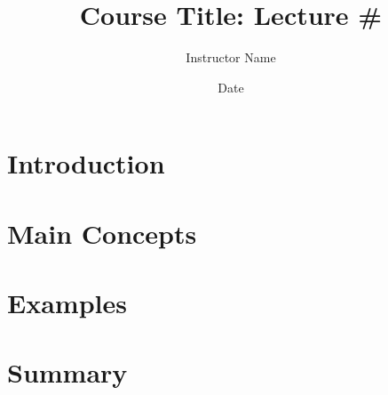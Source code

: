\documentclass[12pt]{article}
\begin{document}
\title{Course Title: Lecture \#}
\author{Instructor Name}
\date{Date}
\maketitle

\tableofcontents
\newpage

\section{Introduction}

\section{Main Concepts}

\section{Examples}

\section{Summary}
\end{document}
